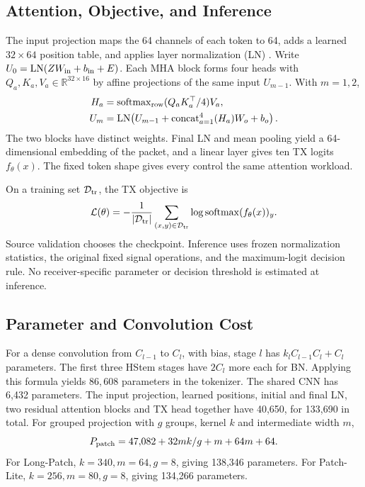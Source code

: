 \documentclass[journal]{IEEEtran}
\begin{document}
\subsection{Attention, Objective, and Inference}
The input projection maps the 64 channels of each token to 64, adds a learned \(32\times64\) position table, and applies layer normalization (LN) \cite{ba2016layer}. Write \(U_0=\operatorname{LN}(Z W_{\rm in}+b_{\rm in}+E)\). Each MHA block forms four heads with \(Q_a,K_a,V_a\in\mathbb R^{32\times16}\) by affine projections of the same input \(U_{m-1}\). With \(m=1,2\),
\begin{align}
 H_a&=\operatorname{softmax}_{\rm row}(Q_aK_a^\top/4)V_a,\\
 U_m&=\operatorname{LN}\!\left(U_{m-1}+
        \operatorname{concat}_{a=1}^{4}(H_a)W_o+b_o\right).
\end{align}
The two blocks have distinct weights. Final LN and mean pooling yield a 64-dimensional embedding of the packet, and a linear layer gives ten TX logits \(f_\theta(x)\). The fixed token shape gives every control the same attention workload.

On a training set \(\mathcal D_{\rm tr}\), the TX objective is
\begin{equation}
 {\cal L}(\theta)=-\frac{1}{|\mathcal D_{\rm tr}|}
 \sum_{(x,y)\in\mathcal D_{\rm tr}}
 \log \operatorname{softmax}(f_\theta(x))_y .
\end{equation}
Source validation chooses the checkpoint. Inference uses frozen normalization statistics, the original fixed signal operations, and the maximum-logit decision rule. No receiver-specific parameter or decision threshold is estimated at inference.

\subsection{Parameter and Convolution Cost}
For a dense convolution from \(C_{l-1}\) to \(C_l\), with bias, stage \(l\) has \(k_l C_{l-1}C_l+C_l\) parameters. The first three HStem stages have \(2C_l\) more each for BN. Applying this formula yields \(86{,}608\) parameters in the tokenizer. The shared CNN has 6,432 parameters. The input projection, learned positions, initial and final LN, two residual attention blocks and TX head together have 40,650, for 133,690 in total. For grouped projection with \(g\) groups, kernel \(k\) and intermediate width \(m\),
\begin{equation}
 P_{\rm patch}=47{,}082+32mk/g+m+64m+64.
\end{equation}
For Long-Patch, \(k=340,m=64,g=8\), giving 138,346 parameters. For Patch-Lite, \(k=256,m=80,g=8\), giving 134,266 parameters.
\end{document}
